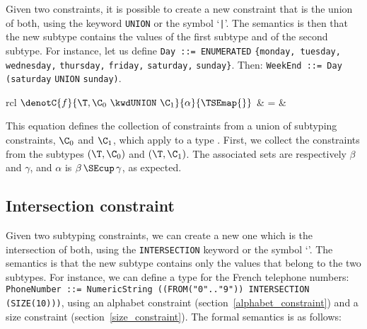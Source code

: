 Given two constraints, it is possible to create a new constraint that
is the union of both, using the keyword \texttt{\small UNION} or the
symbol `\texttt{|}'. The semantics is then that the new subtype
contains the values of the first subtype and of the second
subtype. For instance, let us define \texttt{\small Day ::=
ENUMERATED} \verb+{+\texttt{mon\-day, tues\-day, wed\-nes\-day,}
\texttt{thurs\-day,} \texttt{fri\-day,} \texttt{sa\-tur\-day,}
\texttt{sun\-day}\verb+}+. Then: \texttt{\small WeekEnd
::= Day (}\texttt{sa\-tur\-day} \texttt{\small UNION}
\texttt{sun\-day)}.

\medskip

\noindent
\begin{tabular}{rcl}
    $\denotC{f}{\T, \C_0 \,\, \kwdUNION \,\, \C_1}{\alpha}{\TSEmap{}}$
  & \hspace*{-4mm} = & \hspace*{-4mm}\\
\end{tabular}

\medskip

This equation defines the collection of constraints from a union of
subtyping constraints, $\C_0$ and $\C_1$, which apply to a type
\T. First, we collect the constraints from the subtypes $(\T, \C_0)$
and $(\T, \C_1)$. The associated sets are respectively $\beta$ and
$\gamma$, and $\alpha$ is $\beta \, \SEcup \, \gamma$, as expected.


\subsection{Intersection constraint}\label{intersection_constraint}

Given two subtyping constraints, we can create a new one which is the
intersection of both, using the \texttt{\small INTERSECTION} keyword
or the symbol `\texttt{}'. The semantics is that the new
subtype contains only the values that belong to the two subtypes. For
instance, we can define a type for the French telephone numbers:
\texttt{\small PhoneNumber ::= NumericString ((FROM("0".."9"))
INTERSECTION (SIZE(10)))}, using an alphabet constraint
(section~\ref{alphabet_constraint}) and a size constraint
(section~\ref{size_constraint}). The formal semantics is as follows:

